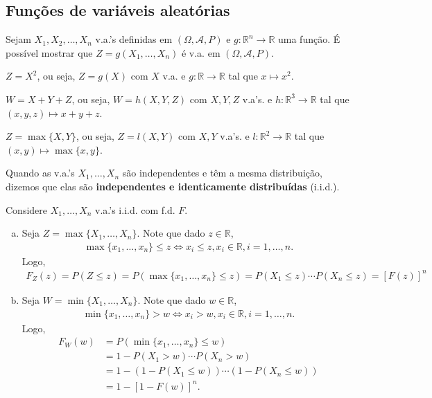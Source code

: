 \documentclass[../Notas.tex]{subfiles}
\begin{document}
\subsection{Funções de variáveis aleatórias}
Sejam $X_1, X_2, \dots, X_n$ v.a.'s definidas em $(\Omega, \mathcal{A}, P)$ e $g:\mathbb{R}^n\to\mathbb{R}$ uma função. É possível mostrar que $Z = g(X_1, \dots, X_n)$ é v.a. em $(\Omega, \mathcal{A}, P)$.
\begin{example}
$Z = X^2$, ou seja, $Z=g(X)$ com $X$ v.a. e $g:\mathbb{R}\to\mathbb{R}$ tal que $x\mapsto x^2$.
\end{example}

\begin{example}
$W = X+Y+Z$, ou seja, $W=h(X,Y,Z)$ com $X,Y,Z$ v.a's. e $h:\mathbb{R}^3\to\mathbb{R}$ tal que $(x,y,z)\mapsto x+y+z$.
\end{example}

\begin{example}
$Z = \max\{X,Y\}$, ou seja, $Z=l(X,Y)$ com $X,Y$ v.a's. e $l:\mathbb{R}^2\to\mathbb{R}$ tal que $(x,y)\mapsto \max\{x,y\}$.
\end{example}

\begin{remark}
Quando as v.a.'s $X_1, \dots, X_n$ são independentes e têm a mesma distribuição, dizemos que elas são \textbf{independentes e identicamente distribuídas} (i.i.d.).
\end{remark}

\begin{example}
Considere $X_1, \dots, X_n$ v.a.'s i.i.d. com f.d. $F$.
\begin{enumerate}[(a)]
    \item Seja $Z = \max\{ X_1, \dots, X_n \}$. Note que dado $z\in\mathbb{R}$,
    \begin{align*}
        \max\{x_1, \dots, x_n\} \leq z \iff x_i\leq z, x_i\in\mathbb{R}, i = 1, \dots, n.
    \end{align*}
    Logo,
    \begin{align*}
        F_Z(z) = P(Z\leq z) = P(\max\{x_1, \dots, x_n\}\leq z) = P(X_1\leq z)\cdots P(X_n\leq z) = [F(z)]^n
    \end{align*}
    \item Seja $W = \min\{ X_1, \dots, X_n \}$. Note que dado $w\in\mathbb{R}$,
    \begin{align*}
        \min\{x_1, \dots, x_n\} > w \iff x_i > w, x_i\in\mathbb{R}, i = 1, \dots, n.
    \end{align*}
    Logo,
    \begin{align*}
        F_W(w) &= P(\min\{x_1, \dots, x_n\}\leq w) \\
        &= 1 - P(X_1 > w)\cdots P(X_n > w) \\
        &= 1 - (1 - P(X_1\leq w))\cdots (1 - P(X_n\leq w))\\
        &= 1 - [1-F(w)]^n.
    \end{align*}
\end{enumerate}
\end{example}
\end{document}
